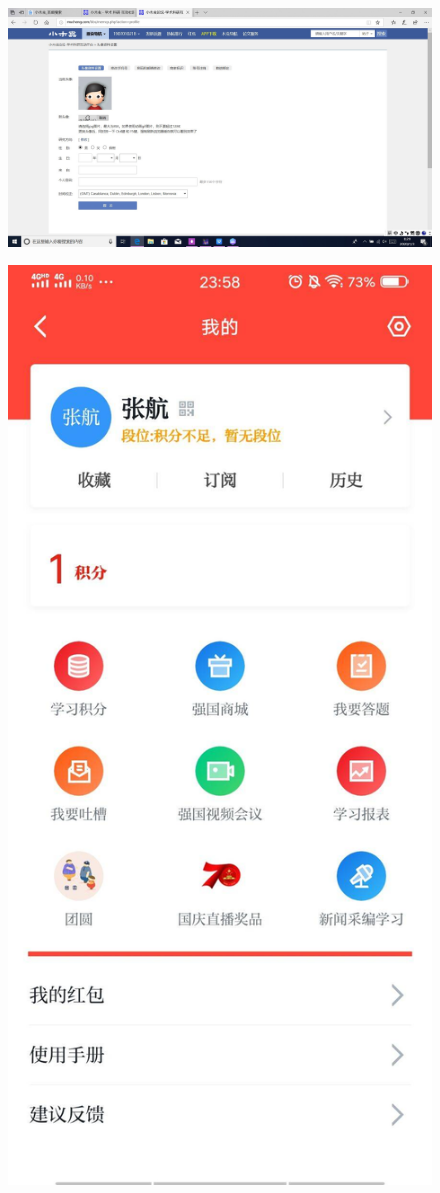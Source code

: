 \documentclass{article}
\begin{document}
  \begin{figure}[H]
	\centering
	\includegraphics[scale=0.5]{xiaomuchong}
	\caption{}
	\label{fig:xiaomuchong}
\end{figure}
  \begin{figure}[H]
	\centering
	\includegraphics[scale=0.5]{xuexi}
	\caption{}
	\label{fig:xuexi}
\end{figure}
\hspace*{\fill} \\

{\bf }


\end{document}
